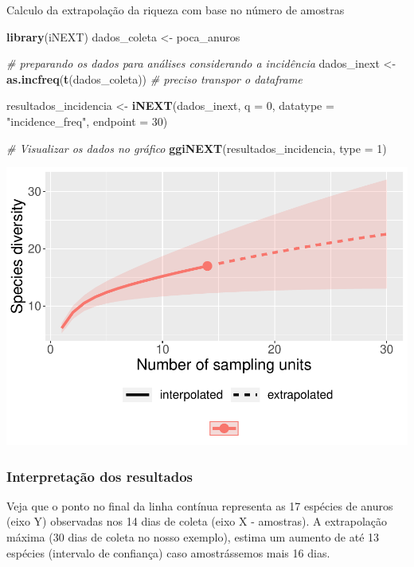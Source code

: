 \documentclass[
]{book}
\newenvironment{Shaded}{\begin{snugshade}}{\end{snugshade}}
\newcommand{\CommentTok}[1]{\textcolor[rgb]{0.56,0.35,0.01}{\textit{#1}}}
\newcommand{\DataTypeTok}[1]{\textcolor[rgb]{0.13,0.29,0.53}{#1}}
\newcommand{\DecValTok}[1]{\textcolor[rgb]{0.00,0.00,0.81}{#1}}
\newcommand{\KeywordTok}[1]{\textcolor[rgb]{0.13,0.29,0.53}{\textbf{#1}}}
\newcommand{\NormalTok}[1]{#1}
\newcommand{\StringTok}[1]{\textcolor[rgb]{0.31,0.60,0.02}{#1}}
\begin{document}
Calculo da extrapolação da riqueza com base no número de amostras

\begin{Shaded}
\begin{Highlighting}[]
\KeywordTok{library}\NormalTok{(iNEXT)}
\NormalTok{dados_coleta <-}\StringTok{ }\NormalTok{poca_anuros}

\CommentTok{# preparando os dados para análises considerando a incidência}
\NormalTok{dados_inext <-}\StringTok{ }\KeywordTok{as.incfreq}\NormalTok{(}\KeywordTok{t}\NormalTok{(dados_coleta)) }\CommentTok{# preciso transpor o dataframe}

\NormalTok{resultados_incidencia <-}\StringTok{ }\KeywordTok{iNEXT}\NormalTok{(dados_inext, }\DataTypeTok{q =} \DecValTok{0}\NormalTok{, }\DataTypeTok{datatype =} \StringTok{"incidence_freq"}\NormalTok{, }
			\DataTypeTok{endpoint =} \DecValTok{30}\NormalTok{)}

\CommentTok{# Visualizar os dados no gráfico}
\KeywordTok{ggiNEXT}\NormalTok{(resultados_incidencia, }\DataTypeTok{type =} \DecValTok{1}\NormalTok{)}
\end{Highlighting}
\end{Shaded}

\includegraphics{livro_r_ecologia_files/figure-latex/unnamed-chunk-33-1.pdf}

\hypertarget{interpretauxe7uxe3o-dos-resultados-7}{%
\subsubsection{Interpretação dos resultados}\label{interpretauxe7uxe3o-dos-resultados-7}}

Veja que o ponto no final da linha contínua representa as 17 espécies de anuros (eixo Y) observadas nos 14 dias de coleta (eixo X - amostras). A extrapolação máxima (30 dias de coleta no nosso exemplo), estima um aumento de até 13 espécies (intervalo de confiança) caso amostrássemos mais 16 dias.
\end{document}
